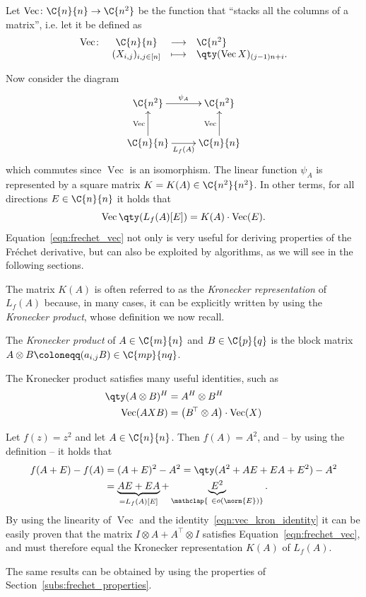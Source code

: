 \begin{definizione}
	Let $\operatorname{Vec}\colon\C{n}{n}\to\C{n^2}$ be the function that ``stacks all the columns of a matrix'', i.e. let it be defined as 
	\[
		\begin{array}{rccl}
			\operatorname{Vec}\colon & \C{n}{n} & \longrightarrow & \C{n^2}\\
				& (X_{i,j})_{i,j\in[n]} & \longmapsto & \qty(\operatorname{Vec}X)_{(j-1)n+i}.
		\end{array}
	\]
\end{definizione}
\noindent Now consider the diagram 
\[
\xymatrix{
	\C{n^2} \ar[r]^{\psi_A} & \C{n^2} \\
	\C{n}{n} \ar[u]^{\operatorname{Vec}} \ar[r]_{L_f(A)} & \C{n}{n} \ar[u]^{\operatorname{Vec}}
}
\]
which commutes since $\operatorname{Vec}$ is an isomorphism. The linear function $\psi_A$ is represented by a square matrix $K=K(A)\in\C{n^2}{n^2}$. In other terms, for all directions $E\in\C{n}{n}$ it holds that
\begin{equation}\label{eqn:frechet_vec}
	\operatorname{Vec}\qty(L_f(A)[E])=K(A)\cdot\operatorname{Vec}(E).
\end{equation}
Equation~\eqref{eqn:frechet_vec} not only is very useful for deriving properties of the Fréchet derivative, but can also be exploited by algorithms, as we will see in the following sections.

The matrix $K(A)$ is often referred to as the \emph{Kronecker representation} of $L_f(A)$ because, in many cases, it can be explicitly written by using the \emph{Kronecker product}, whose definition we now recall.
\begin{definizione}\label{def:kronecker_product}
	The \emph{Kronecker product} of $A\in\C{m}{n}$ and $B\in\C{p}{q}$ is the block matrix $A\otimes B\coloneqq(a_{i,j}B)\in\C{mp}{nq}$.
\end{definizione}
The Kronecker product satisfies many useful identities, such as
\begin{align}
	\qty(A\otimes B)^{H} &= A^H\otimes B^H\label{eqn:hermitian_kron}\\
	\operatorname{Vec}(AXB) &= \big(B^{\!\top}\otimes A\big)\cdot\operatorname{Vec}(X)\label{eqn:vec_kron_identity}
\end{align}


\begin{esempio}
	Let $f(z)=z^2$ and let $A\in\C{n}{n}$. Then $f(A)=A^2$, and -- by using the definition -- it holds that
	\begin{align*}
		f(A+E) - f(A) &= (A+E)^2 - A^2 = \qty(A^2 + AE + EA + E^2) - A^2\\
		 &= \underbrace{AE+EA}_{=L_f(A)[E]} + \underbrace{E^2}_{\mathclap{\ \in o(\norm{E})}}.
	\end{align*}
	By using the linearity of $\operatorname{Vec}$ and the identity~\eqref{eqn:vec_kron_identity} it can be easily proven that the matrix $I\otimes A + A^{\top}\otimes I$ satisfies Equation~\eqref{eqn:frechet_vec}, and must therefore equal the Kronecker representation $K(A)$ of $L_f(A)$.
	
	The same results can be obtained by using the properties of Section~\ref{subs:frechet_properties}.
\end{esempio}

